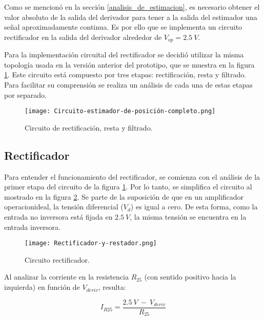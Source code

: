Como se mencionó en la sección \ref{analisis_de_estimacion}, es necesario obtener el valor absoluto de la salida del derivador para tener a la salida del estimador una señal aproximadamente continua. Es por ello que se implementa un circuito rectificador en la salida del derivador alrededor de $V_{op}=2.5\:V$.

Para la implementación circuital del rectificador se decidió utilizar la misma topología usada en la versión anterior del prototipo, que se muestra en la figura \ref{fig:img_Circuito_estimador_de_posición_completo}. Este circuito está compuesto por tres etapas: rectificación, resta y filtrado. Para facilitar su comprensión se realiza un análisis de cada una de estas etapas por separado.

\begin{figure}[H]
	\centering
	\texttt{[image: Circuito-estimador-de-posición-completo.png]}
	\caption{Circuito de rectificación, resta y filtrado.}
	\label{fig:img_Circuito_estimador_de_posición_completo}
\end{figure}

\subsection{Rectificador}

Para entender el funcionamiento del rectificador, se comienza con el análisis de la primer etapa del circuito de la figura \ref{fig:img_Circuito_estimador_de_posición_completo}. Por lo tanto, se simplifica el circuito al mostrado en la figura \ref{fig:img_Rectificador_y_restador}. Se parte de la suposición de que en un amplificador operacionideal, la tensión diferencial ($V_d$) es igual a cero. De esta forma, como la entrada no inversora está fijada en $2.5\:V$, la misma tensión se encuentra en la entrada inversora.


\begin{figure}[H]
	\centering
	\texttt{[image: Rectificador-y-restador.png]}
	\caption{Circuito rectificador.}
	\label{fig:img_Rectificador_y_restador}
\end{figure}

Al analizar la corriente en la resistencia $R_{25}$ (con sentido positivo hacia la izquierda) en función de $V_{deriv}$, resulta:

\begin{equation} \label{eq_corriente_r25}
	I_{R25}=\frac{2.5\:V\ -\ V_{deriv}}{R_{25}}
\end{equation}

